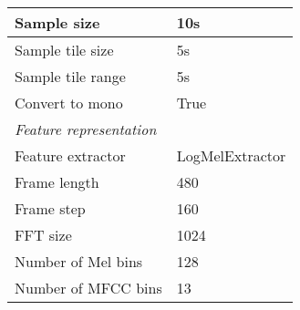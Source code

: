 \begin{table}[H]
\begin{tabular}{l|l}
        \hline
        Sample size & 10s \\
        \hline
        Sample tile size & 5s \\
        \hline
        Sample tile range & 5s \\
        \hline
        Convert to mono & True \\
        \midrule[1pt]
        \multicolumn{2}{l}{\textit{Feature representation}} \\
        \midrule[1pt]
        Feature extractor & LogMelExtractor \\ 
        \hline
        Frame length & 480 \\
        \hline
        Frame step & 160 \\
        \hline
        FFT size & 1024 \\
        \hline
        Number of Mel bins & 128 \\
        \hline
        Number of MFCC bins & 13 \\
        \bottomrule
    \end{tabular}
\end{table}

